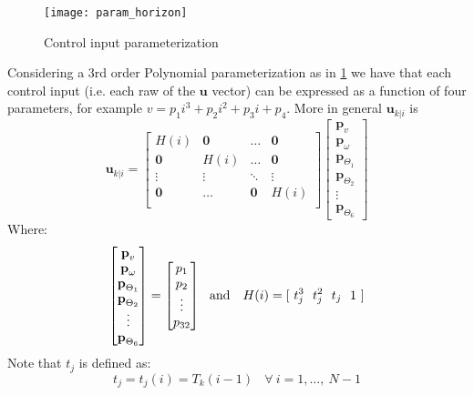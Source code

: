 \begin{figure}[h!]
	\centering
	\texttt{[image: param\_horizon]}
	\caption{Control input parameterization}
	\label{param_horizon}
\end{figure}
Considering a 3rd order Polynomial parameterization as in \ref{param_horizon} we have that each control input (i.e. each raw of the $\textbf{u}$ vector) can be expressed as a function of four parameters, for example $v=p_1i^3+p_2i^2+p_3i+p_4$.
More in general $\textbf{u}_{k|i}$ is
\begin{equation}
\textbf{u}_{k|i}=\left[ \begin{matrix}
H(i)          & \textbf{0} & \dots      & \textbf{0}  \\
\textbf{0} &     H(i)      & \dots      & \textbf{0}  \\
\vdots     & \vdots     & \ddots     & \vdots      \\
\textbf{0} & \dots      & \textbf{0} &   H(i)         \\
\end{matrix} \right] \left[ \begin{matrix} \textbf{p}_v \\ \textbf{p}_{\omega} \\ \textbf{p}_{\Theta_1} \\ \textbf{p}_{\Theta_2} \\ \vdots \\ \textbf{p}_{\Theta_6} \end{matrix} \right]
\end{equation}
Where: 
\begin{equation}
\left[ \begin{matrix} \textbf{p}_v \\ \textbf{p}_{\omega} \\ \textbf{p}_{\Theta_1} \\ \textbf{p}_{\Theta_2} \\ \vdots \\ \textbf{p}_{\Theta_6} \end{matrix} \right] = \left[ \begin{matrix} p_1 \\ p_2 \\ \vdots \\ p_{32} \end{matrix} \right]\ \ \textnormal{and }\ \ H(i)=[\ t_j^3\ \ t_j^2\ \ t_j\ \ 1\ ]
\end{equation}
Note that $t_j$  is defined as:
\begin{equation*}
	t_j=t_j(i)=T_k(i-1)\ \ \ \ \forall\ i=1,\dots,\ N-1
\end{equation*}
